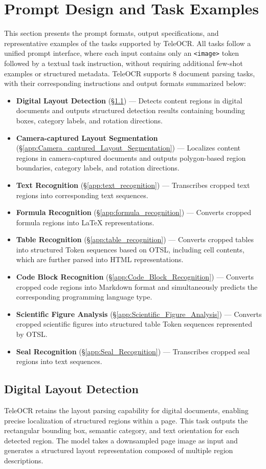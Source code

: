\documentclass{fairmeta}
\begin{document}
\section{Prompt Design and Task Examples}
This section presents the prompt formats, output specifications, and representative examples of the tasks supported by TeleOCR. All tasks follow a unified prompt interface, where each input contains only an \texttt{<image>} token followed by a textual task instruction, without requiring additional few-shot examples or structured metadata. TeleOCR supports 8 document parsing tasks, with their corresponding instructions and output formats summarized below:
\begin{itemize}
\item \textbf{Digital Layout Detection} (\S\ref{app:Digital_Layout_Detection}) — Detects content regions in digital documents and outputs structured detection results containing bounding boxes, category labels, and rotation directions.
\item \textbf{Camera-captured Layout Segmentation} (\S\ref{app:Camera_captured_Layout_Segmentation}) — Localizes content regions in camera-captured documents and outputs polygon-based region boundaries, category labels, and rotation directions.
\item \textbf{Text Recognition} (\S\ref{app:text_recognition}) — Transcribes cropped text regions into corresponding text sequences.
\item \textbf{Formula Recognition} (\S\ref{app:formula_recognition}) — Converts cropped formula regions into LaTeX representations.
\item \textbf{Table Recognition} (\S\ref{app:table_recognition}) — Converts cropped tables into structured Token sequences based on OTSL, including cell contents, which are further parsed into HTML representations.
\item \textbf{Code Block Recognition} (\S\ref{app:Code_Block_Recognition}) — Converts cropped code regions into Markdown format and simultaneously predicts the corresponding programming language type.
\item \textbf{Scientific Figure Analysis} (\S\ref{app:Scientific_Figure_Analysis}) — Converts cropped scientific figures into structured table Token sequences represented by OTSL.
\item \textbf{Seal Recognition} (\S\ref{app:Seal_Recognition}) — Transcribes cropped seal regions into text sequences.
\end{itemize}

\subsection{Digital Layout Detection}
\label{app:Digital_Layout_Detection}
TeleOCR retains the layout parsing capability for digital documents, enabling precise localization of structured regions within a page. This task outputs the rectangular bounding box, semantic category, and text orientation for each detected region. The model takes a downsampled page image as input and generates a structured layout representation composed of multiple region descriptions.
\end{document}
